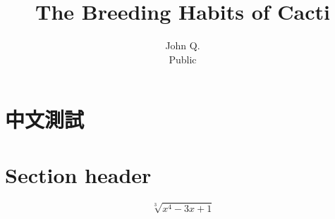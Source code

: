 \documentclass[12pt]{article}
\title{The Breeding Habits of Cacti}
\author{John Q.\\ Public}
\begin{document}
\maketitle
\section{中文測試}
\section{Section header}
\[\sqrt[3]{x^4-3x+1}\]
\end{document}
